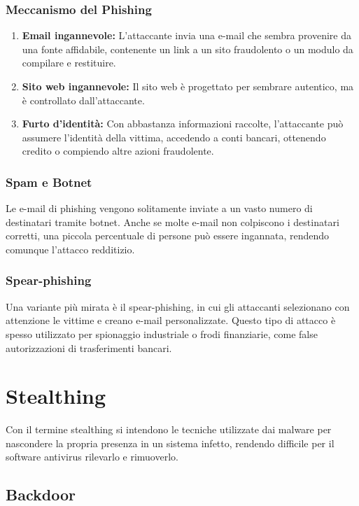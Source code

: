 \subsubsection{Meccanismo del Phishing}

\begin{enumerate}
    \item \textbf{Email ingannevole:} L'attaccante invia una e-mail che sembra provenire da una fonte affidabile, contenente un link a un sito fraudolento o un modulo da compilare e restituire.
    \item \textbf{Sito web ingannevole:} Il sito web è progettato per sembrare autentico, ma è controllato dall'attaccante.
    \item \textbf{Furto d'identità:} Con abbastanza informazioni raccolte, l'attaccante può assumere l'identità della vittima, accedendo a conti bancari, ottenendo credito o compiendo altre azioni fraudolente.
\end{enumerate}

\subsubsection{Spam e Botnet}

Le e-mail di phishing vengono solitamente inviate a un vasto numero di destinatari tramite botnet. Anche se molte e-mail non colpiscono i destinatari corretti, una piccola percentuale di persone può essere ingannata, rendendo comunque l'attacco redditizio.

\subsubsection{Spear-phishing}

Una variante più mirata è il spear-phishing, in cui gli attaccanti selezionano con attenzione le vittime e creano e-mail personalizzate. Questo tipo di attacco è spesso utilizzato per spionaggio industriale o frodi finanziarie, come false autorizzazioni di trasferimenti bancari.

\section{Stealthing}

Con il termine stealthing si intendono le tecniche utilizzate dai malware per nascondere la propria presenza in un sistema infetto, rendendo difficile per il software antivirus rilevarlo e rimuoverlo.

\subsection{Backdoor}

